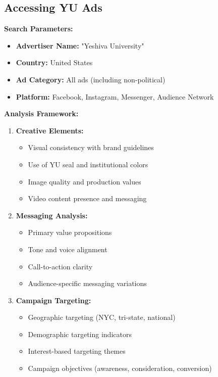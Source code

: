 \documentclass[12pt,letterpaper]{article}
\begin{document}
\subsection{Accessing YU Ads}

\textbf{Search Parameters:}
\begin{itemize}[leftmargin=*]
    \item \textbf{Advertiser Name:} "Yeshiva University"
    \item \textbf{Country:} United States
    \item \textbf{Ad Category:} All ads (including non-political)
    \item \textbf{Platform:} Facebook, Instagram, Messenger, Audience Network
\end{itemize}

\textbf{Analysis Framework:}
\begin{enumerate}[leftmargin=*]
    \item \textbf{Creative Elements:}
    \begin{itemize}
        \item Visual consistency with brand guidelines
        \item Use of YU seal and institutional colors
        \item Image quality and production values
        \item Video content presence and messaging
    \end{itemize}

    \item \textbf{Messaging Analysis:}
    \begin{itemize}
        \item Primary value propositions
        \item Tone and voice alignment
        \item Call-to-action clarity
        \item Audience-specific messaging variations
    \end{itemize}

    \item \textbf{Campaign Targeting:}
    \begin{itemize}
        \item Geographic targeting (NYC, tri-state, national)
        \item Demographic targeting indicators
        \item Interest-based targeting themes
        \item Campaign objectives (awareness, consideration, conversion)
    \end{itemize}
\end{enumerate}
\end{document}
